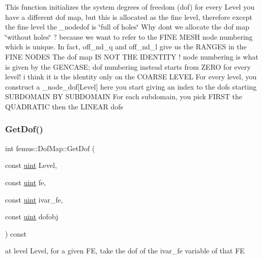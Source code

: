 This function initializes the system degrees of freedom (dof) for every Level you have a different dof map, but this is allocated as the fine level, therefore except the fine level the \+\_\+nodedof is \char`\"{}full of holes\char`\"{} Why dont we allocate the dof map \char`\"{}without holes\char`\"{} ? because we want to refer to the F\+I\+NE M\+E\+SH node numbering which is unique. In fact, off\+\_\+nd\+\_\+q and off\+\_\+nd\+\_\+l give us the R\+A\+N\+G\+ES in the F\+I\+NE N\+O\+D\+ES The dof map IS N\+OT T\+HE I\+D\+E\+N\+T\+I\+TY ! node numbering is what is given by the G\+E\+N\+C\+A\+SE; dof numbering instead starts from Z\+E\+RO for every level! i think it is the identity only on the C\+O\+A\+R\+SE L\+E\+V\+EL For every level, you construct a \+\_\+node\+\_\+dof\mbox{[}Level\mbox{]} here you start giving an index to the dofs starting S\+U\+B\+D\+O\+M\+A\+IN BY S\+U\+B\+D\+O\+M\+A\+IN For each subdomain, you pick F\+I\+R\+ST the Q\+U\+A\+D\+R\+A\+T\+IC then the L\+I\+N\+E\+AR dofs \mbox{\label{classfemus_1_1_dof_map_a26b59524fe1b0d8d17ce74f5776cbe5d}} 
\subsubsection{\texorpdfstring{Get\+Dof()}{GetDof()}}
{\footnotesize\ttfamily int femus\+::\+Dof\+Map\+::\+Get\+Dof (\begin{DoxyParamCaption}\item[{const \mbox{\hyperlink{_typedefs_8hpp_a91ad9478d81a7aaf2593e8d9c3d06a14}{uint}}}]{Level,  }\item[{const \mbox{\hyperlink{_typedefs_8hpp_a91ad9478d81a7aaf2593e8d9c3d06a14}{uint}}}]{fe,  }\item[{const \mbox{\hyperlink{_typedefs_8hpp_a91ad9478d81a7aaf2593e8d9c3d06a14}{uint}}}]{ivar\+\_\+fe,  }\item[{const \mbox{\hyperlink{_typedefs_8hpp_a91ad9478d81a7aaf2593e8d9c3d06a14}{uint}}}]{dofobj }\end{DoxyParamCaption}) const\hspace{0.3cm}{\ttfamily [inline]}}

at level Level, for a given FE, take the dof of the ivar\+\_\+fe variable of that FE \mbox{\label{classfemus_1_1_dof_map_a394c1fc6f3544f138fdb10ef6acced47}} 
